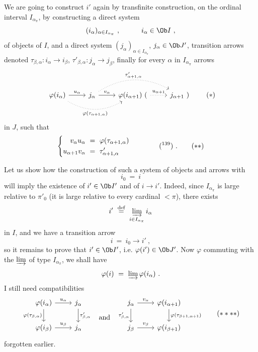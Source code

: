 We are going to construct $i'$ again by transfinite construction, on the ordinal interval $I_{\alpha_\pi}$, by constructing a direct system
\[
(i_\alpha)_{\alpha\in I_{\alpha_\pi}} \ , \qquad\quad i_\alpha \in \Ob I \ ,
\]
of objects of $I$, and a direct system $(j_\alpha)_{\alpha\in I_{\alpha_\pi}}$, $j_\alpha \in \Ob J'$, transition arrows denoted $\tau_{\beta,\alpha} : i_\alpha \longrightarrow i_\beta$, $\tau'_{\beta,\alpha} : j_\alpha \longrightarrow j_\beta$, finally for every $\alpha$ in $I_{\alpha_\pi}$ arrows
\[
\begin{tikzcd}
\varphi(i_\alpha) \arrow[r, "u_\alpha"] \arrow[rr, dotted, bend right, "\varphi(\tau_{\alpha+1,\alpha})"'] & j_\alpha \arrow[r, "v_\alpha"] \arrow[rr, dotted, bend left, "\tau'_{\alpha+1,\alpha}"] & \varphi(i_{\alpha+1})\ ( \arrow[r, dotted, "u_{\alpha+1}"] & j_{\alpha+1}\ )
\end{tikzcd}
\tag*{$(*)$}
\]
in $J$, such that
\[
\left\{
\begin{aligned}
v_\alpha u_\alpha \ &= \ \varphi(\tau_{\alpha+1,\alpha}) \\
u_{\alpha+1} v_\alpha \ &= \ \tau'_{\alpha+1,\alpha}
\end{aligned}
\right.
\qquad\qquad \text{(\footnotemark[139])} \ .
\tag*{$(**)$}
\]

\noindent Let us show how the construction of such a system of objects and arrows with
\[
i_0 \ = \ i \tag*{$(***)$}
\]
will imply the existence of $i' \in \Ob I'$ and of $i \longrightarrow i'$. Indeed, since $I_{\alpha_\pi}$ is large relative to $\pi'_0$ (it is large relative to every cardinal $< \pi$), there exists
\[
i' \ \overset{\text{def}}{=} \ \varinjlim_{i\in I_{\alpha_\pi}} i_\alpha %
\]
in $I$, and we have a transition arrow
\[
i \ = \ i_0 \longrightarrow i' \ ,
\]
so it remains to prove that $i' \in \Ob I'$, i.e. $\varphi(i') \in \Ob J'$. Now $\varphi$ commuting with the $\varinjlim$ of type $I_{\alpha_\pi}$, we shall have
\[
\varphi(i) \ = \ \varinjlim \varphi(i_\alpha) \ .
\]
I still need compatibilities
\[
\begin{tikzcd}
\varphi(i_\alpha) \arrow[r, "u_\alpha"] \arrow[d, "\varphi(\tau_{\beta,\alpha})"'] & j_\alpha \arrow[d, "\tau'_{\beta,\alpha}"] & {} \arrow[d, phantom, "\text{and}" description] & j_\alpha \arrow[r, "v_\alpha"] \arrow[d, "\tau'_{\beta,\alpha}"'] & \varphi(i_{\alpha+1}) \arrow[d, "\varphi(\tau_{\beta+1,\alpha+1})"] \\
\varphi(i_\beta) \arrow[r, "u_\beta"] & j_\alpha & {} & j_\beta \arrow[r, "v_\beta"] & \varphi(i_{\beta+1})
\end{tikzcd}
\tag*{$(****)$} %
\]
forgotten earlier.

